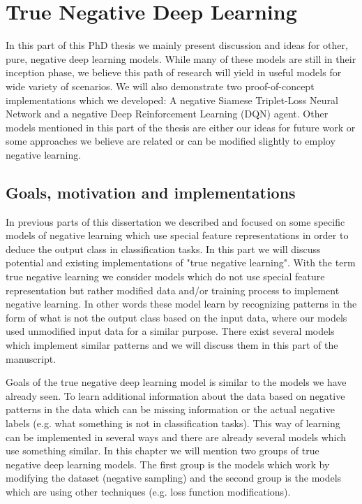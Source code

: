 \documentclass[b5paper]{book}
\begin{document}
\part{True Negative Deep Learning}

In this part of this PhD thesis we mainly present discussion and ideas for other, pure, negative deep learning models. While many of these models are still in their inception phase, we believe this path of research will yield in useful models for wide variety of scenarios. We will also demonstrate two proof-of-concept implementations which we developed: A negative Siamese Triplet-Loss Neural Network and a negative Deep Reinforcement Learning (DQN) agent. Other models mentioned in this part of the thesis are either our ideas for future work or some approaches we believe are related or can be modified slightly to employ negative learning.

\chapter{Goals, motivation and implementations}
In previous parts of this dissertation we described and focused on some specific models of negative learning which use special feature representations in order to deduce the output class in classification tasks. In this part we will discuss potential and existing implementations of "true negative learning". With the term true negative learning we consider models which do not use special feature representation but rather modified data and/or training process to implement negative learning. In other words these model learn by recognizing patterns in the form of what is not the output class based on the input data, where our models used unmodified input data for a similar purpose. There exist several models which implement similar patterns and we will discuss them in this part of the manuscript.

Goals of the true negative deep learning model is similar to the models we have already seen. To learn additional information about the data based on negative patterns in the data which can be missing information or the actual negative labels (e.g. what something is not in classification tasks). This way of learning can be implemented in several ways and there are already several models which use something similar. In this chapter we will mention two groups of true negative deep learning models. The first group is the models which work by modifying the dataset (negative sampling) and the second group is the models which are using other techniques (e.g. loss function modifications).
\end{document}
